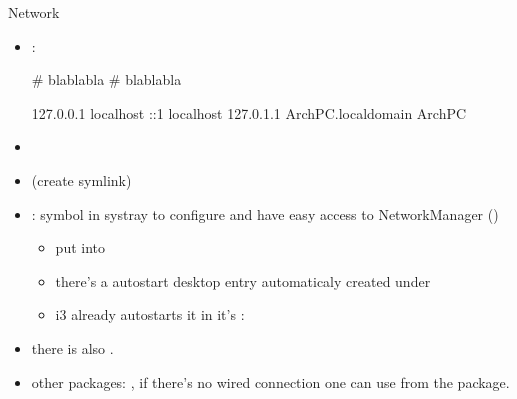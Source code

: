 \begin{frame}{Network}
  \begin{itemize}
     \item {}:
       \begin{terminal}[]
        # blablabla
        # blablabla

        127.0.0.1 localhost
        ::1 localhost
        127.0.1.1 ArchPC.localdomain ArchPC
     \end{terminal}
    \item {}
    \item {} (create symlink)
    \item {}: symbol in systray to configure and have easy access to NetworkManager ()
      \begin{itemize}
      \item put  into 
      \item there's a autostart desktop entry automaticaly created under 
      \item i3 already autostarts it in it's : 
      \end{itemize}
  \end{itemize}
  \begin{Sidenote}
    \begin{itemize}
      \item there is also .
    \end{itemize}
  \end{Sidenote}
  \begin{Sidenote}
    \begin{itemize}
      \item \alert{other packages:} , if there's no wired connection one can use  from the  package.
    \end{itemize}
  \end{Sidenote}
\end{frame}

